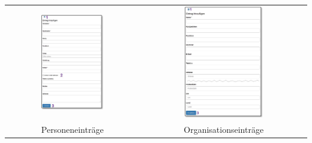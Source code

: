 \begin{tabular}{cc} %
\includegraphics[width=0.49\textwidth]{../chapters/03_Adressliste/pictures/3-2_Personeneintraege.jpg} & \includegraphics[width=0.49\textwidth]{../chapters/03_Adressliste/pictures/3-2_Firmeneintraege.jpg} \\
Personeneinträge & Organisationseinträge \\
\end{tabular}


